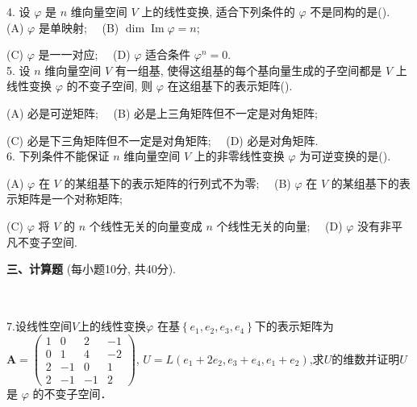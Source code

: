\documentclass[11pt,a4paper]{article}
\renewcommand{\arraystretch}{0.8}
\begin{document}
	
	\vspace{0.2cm}
	4. 设  $\varphi$  是  $n$  维向量空间  $V$  上的线性变换, 适合下列条件的  $\varphi$  不是同构的是(\quad\quad\quad ).\\
	(A) $\varphi$  是单映射; \ \ (B)  $\operatorname{dim} \operatorname{Im} \varphi=n$;\par
	(C) $\varphi$  是一一对应; \ \ (D)  $\varphi$  适合条件  $\varphi^{n}=0$.\\
	
	5. 设  $n$  维向量空间  $V$  有一组基, 使得这组基的每个基向量生成的子空间都是  $V$  上线性变换  $\varphi$  的不变子空间, 则  $\varphi$  在这组基下的表示矩阵(\quad\quad\quad ).\par
	(A) 必是可逆矩阵; \ \ (B)  必是上三角矩阵但不一定是对角矩阵;\ \ \par
	(C) 必是下三角矩阵但不一定是对角矩阵; \ \ (D)  必是对角矩阵.\\
	
	
	6. 下列条件不能保证  $n$  维向量空间  $V$  上的非零线性变换  $\varphi$  为可逆变换的是(\quad\quad\quad ).\par
	(A)  $\varphi$  在  $V$  的某组基下的表示矩阵的行列式不为零; \ \  (B)   $\varphi$  在  $V$  的某组基下的表示矩阵是一个对称矩阵;\ \ \par
	(C)  $\varphi$  将  $V$  的  $n$  个线性无关的向量变成  $n$  个线性无关的向量; \ \ (D) $\varphi$  没有非平凡不变子空间.\\
	
	\renewcommand{\arraystretch}{1.5}
	
	\vspace{0.2cm}
	
	

	
	
	{\bf 三、计算题}
	{(每小题10分, 共40分).}
	\renewcommand{\arraystretch}{1.2}
	\hfill
	\begin{tabular}{|c|c|}
		\hline
		\makebox[2.5em]{得分} & \makebox[3.0em]{} \\
		\hline
	\end{tabular}
	\renewcommand{\arraystretch}{1.0}\\

	7.设线性空间$  V  $上的线性变换$  \varphi $ 在基$  \left\{e_{1}, e_{2}, e_{3}, e_{4}\right\}  $下的表示矩阵为$\boldsymbol{A}=\left(\begin{array}{cccc}1 & 0 & 2 & -1 \\0 & 1 & 4 & -2 \\2 & -1 & 0 & 1 \\2 & -1 & -1 & 2\end{array}\right)$,
	$ U=L\left(e_{1}+2 e_{2}, e_{3}+e_{4}, e_{1}+e_{2}\right) $,求$U$的维数并证明$U$ 是 $ \varphi $ 的不变子空间．
	
\end{document}
